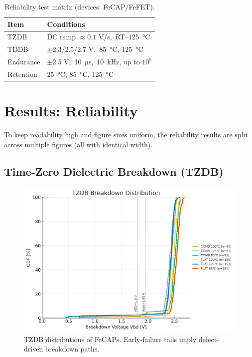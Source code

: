 \documentclass[conference]{IEEEtran}
\newcommand{\figw}{0.90\linewidth}
\begin{document}
\begin{table}[!t]
  \centering
  \caption{Reliability test matrix (devices: FeCAP/FeFET).}
  \label{tab:test-matrix}
  \begin{tabular}{@{}ll@{}}
    \toprule
    \textbf{Item} & \textbf{Conditions} \\
    \midrule
    TZDB     & DC ramp $\approx 0.1$ V/s,\ RT--\SI{125}{\celsius} \\
    TDDB     & $\pm$2.3/2.5/2.7 V,\ \SI{85}{\celsius}, \SI{125}{\celsius} \\
    Endurance& $\pm$2.5 V,\ \SI{10}{\micro\second},\ \SI{10}{\kilo\hertz}, up to $10^5$ \\
    Retention& \SI{25}{\celsius}, \SI{85}{\celsius}, \SI{125}{\celsius} \\
    \bottomrule
  \end{tabular}
\end{table}

\section{Results: Reliability}
To keep readability high and figure sizes uniform, the reliability results are split across multiple figures (all with identical width).

\subsection{Time-Zero Dielectric Breakdown (TZDB)}
\begin{figure}[!t]
  \centering
  \includegraphics[width=\figw]{figures/fig3_tzdb.png}
  \caption{TZDB distributions of FeCAPs. Early-failure tails imply defect-driven breakdown paths.}
  \label{fig:tzdb}
\end{figure}
\end{document}
